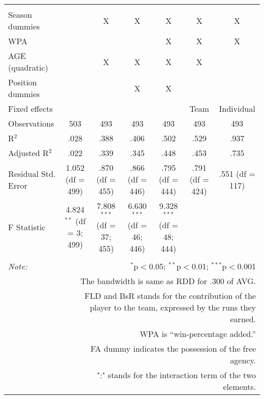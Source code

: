 \begin{table}[H]
\begin{tabular}{@{\extracolsep{-15pt}}lcccccc}
  & & & & & & \\
\hline \\[-1.8ex]
Season dummies &  & X & X & X & X & X \\
WPA &  &  &  & X & X & X \\
AGE (quadratic) &  & X & X & X & X &  \\
Position dummies &  &  & X & X &  &  \\
Fixed effects &  &  &  &  & Team & Individual \\
Observations & 503 & 493 & 493 & 493 & 493 & 493 \\
R$^{2}$ & .028 & .388 & .406 & .502 & .529 & .937 \\
Adjusted R$^{2}$ & .022 & .339 & .345 & .448 & .453 & .735 \\
Residual Std. Error & 1.052 (df = 499) & .870 (df = 455) & .866 (df = 446) & .795 (df = 444) & .791 (df = 424) & .551 (df = 117) \\
F Statistic & 4.824$^{**}$ (df = 3; 499) & 7.808$^{***}$ (df = 37; 455) & 6.630$^{***}$ (df = 46; 446) & 9.328$^{***}$ (df = 48; 444) &  &  \\
\hline
\hline \\[-1.8ex]
\textit{Note:}  & \multicolumn{6}{r}{$^{*}$p$<$0.05; $^{**}$p$<$0.01; $^{***}$p$<$0.001} \\
& \multicolumn{6}{r}{The bandwidth is same as RDD for .300 of AVG.} \\
& \multicolumn{6}{r}{FLD and BsR stands for the contribution of the player to the team, expressed by the runs they earned.} \\
& \multicolumn{6}{r}{WPA is ``win-percentage added.''} \\
& \multicolumn{6}{r}{FA dummy indicates the possession of the free agency.}\\
& \multicolumn{6}{r}{":" stands for the interaction term of the two elements.} \\
\end{tabular}
\end{table}

